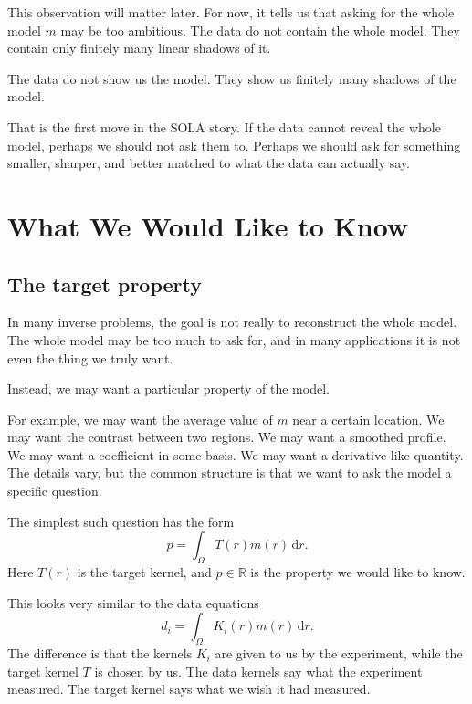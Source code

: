 \documentclass[11pt,openany]{book}
\theoremstyle{definition}
\theoremstyle{remark}
\newcommand{\dd}{\,\mathrm d}
\begin{document}
This observation will matter later. For now, it tells us that asking for the whole model \(m\)
may be too ambitious. The data do not contain the whole model. They contain only finitely many
linear shadows of it.

\begin{checkpointbox}
The data do not show us the model. They show us finitely many shadows of the model.
\end{checkpointbox}

That is the first move in the SOLA story. If the data cannot reveal the whole model, perhaps we
should not ask them to. Perhaps we should ask for something smaller, sharper, and better matched
to what the data can actually say.

\chapter{What We Would Like to Know}

\section{The target property}

In many inverse problems, the goal is not really to reconstruct the whole model. The whole model
may be too much to ask for, and in many applications it is not even the thing we truly want.

Instead, we may want a particular property of the model.

For example, we may want the average value of \(m\) near a certain location. We may want the
contrast between two regions. We may want a smoothed profile. We may want a coefficient in
some basis. We may want a derivative-like quantity. The details vary, but the common structure
is that we want to ask the model a specific question.

The simplest such question has the form
\[
  p
  =
  \int_\Omega T(r)m(r)\dd r.
\]
Here \(T(r)\) is the target kernel, and \(p\in\mathbb R\) is the property we would like to know.

This looks very similar to the data equations
\[
  d_i
  =
  \int_\Omega K_i(r)m(r)\dd r.
\]
The difference is that the kernels \(K_i\) are given to us by the experiment, while the target
kernel \(T\) is chosen by us. The data kernels say what the experiment measured. The target
kernel says what we wish it had measured.
\end{document}
